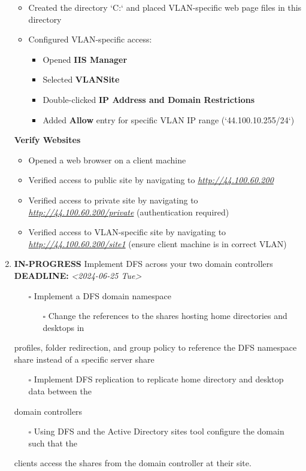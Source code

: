\documentclass[letterpaper]{article}
\begin{document}
\begin{enumerate}
\begin{itemize}
\item Created the directory `C:\inetpub\wwwroot\vlan` and placed VLAN-specific web page files in this directory
\item Configured VLAN-specific access:
\begin{itemize}
\item Opened \textbf{\textbf{IIS Manager}}
\item Selected \textbf{\textbf{VLANSite}}
\item Double-clicked \textbf{\textbf{IP Address and Domain Restrictions}}
\item Added \textbf{\textbf{Allow}} entry for specific VLAN IP range (`44.100.10.255/24`)
\end{itemize}
\end{itemize}
\textbf{Verify Websites}
\begin{itemize}
\item Opened a web browser on a client machine
\item Verified access to public site by navigating to \emph{\url{http://44.100.60.200}}
\item Verified access to private site by navigating to \emph{\url{http://44.100.60.200/private}} (authentication required)
\item Verified access to VLAN-specific site by navigating to \emph{\url{http://44.100.60.200/site1}} (ensure client machine is in correct VLAN)
\end{itemize}
\item {\bfseries\sffamily IN-PROGRESS} Implement DFS across your two domain controllers
\label{sec:orgd8f9fdc}
\noindent\textbf{DEADLINE:} \textit{<2024-06-25 Tue>}\\[0pt]
\begin{itemize}
\item[{$\square$}] Implement a DFS domain namespace
\begin{itemize}
\item[{$\square$}] Change the references to the shares hosting home directories and desktops in
\end{itemize}
\end{itemize}
profiles, folder redirection, and group policy to reference the DFS namespace
share instead of a specific server share
\begin{itemize}
\item[{$\square$}] Implement DFS replication to replicate home directory and desktop data between the
\end{itemize}
domain controllers
\begin{itemize}
\item[{$\square$}] Using DFS and the Active Directory sites tool configure the domain such that the
\end{itemize}
clients access the shares from the domain controller at their site.
\end{enumerate}
\end{document}
